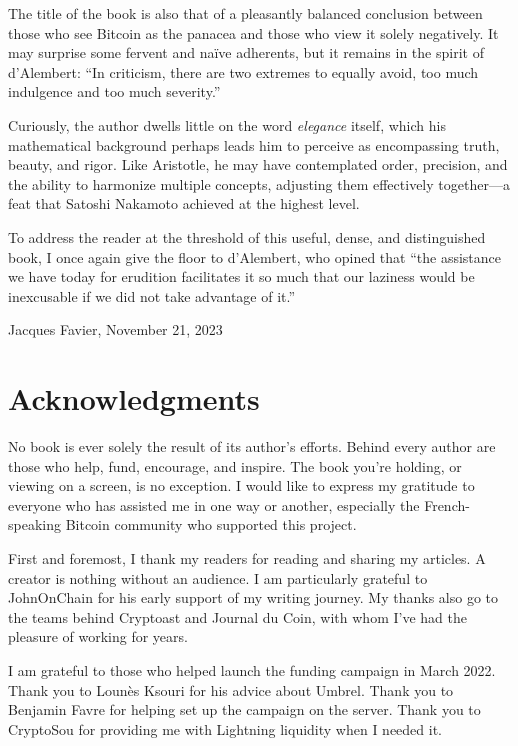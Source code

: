 \documentclass[
  a5paper,
  smalldemyvopaper,10pt,twoside,onecolumn,openright,extrafontsizes,hidelinks]{memoir}
\begin{document}
The title of the book is also that of a pleasantly balanced conclusion
between those who see Bitcoin as the panacea and those who view it
solely negatively. It may surprise some fervent and naïve adherents, but
it remains in the spirit of d'Alembert: ``In criticism, there are two
extremes to equally avoid, too much indulgence and too much severity.''

Curiously, the author dwells little on the word \emph{elegance} itself,
which his mathematical background perhaps leads him to perceive as
encompassing truth, beauty, and rigor. Like Aristotle, he may have
contemplated order, precision, and the ability to harmonize multiple
concepts, adjusting them effectively together---a feat that Satoshi
Nakamoto achieved at the highest level.

To address the reader at the threshold of this useful, dense, and
distinguished book, I once again give the floor to d'Alembert, who
opined that ``the assistance we have today for erudition facilitates it
so much that our laziness would be inexcusable if we did not take
advantage of it.''

Jacques Favier, November 21, 2023


\chapter*{Acknowledgments}\label{remerciements}


No book is ever solely the result of its author's efforts. Behind every
author are those who help, fund, encourage, and inspire. The book you're
holding, or viewing on a screen, is no exception. I would like to
express my gratitude to everyone who has assisted me in one way or
another, especially the French-speaking Bitcoin community who supported
this project.

First and foremost, I thank my readers for reading and sharing my
articles. A creator is nothing without an audience. I am particularly
grateful to JohnOnChain for his early support of my writing journey. My
thanks also go to the teams behind Cryptoast and Journal du Coin, with
whom I've had the pleasure of working for years.

I am grateful to those who helped launch the funding campaign in March
2022. Thank you to Lounès Ksouri for his advice about Umbrel. Thank you
to Benjamin Favre for helping set up the campaign on the server. Thank
you to CryptoSou for providing me with Lightning liquidity when I needed
it.
\end{document}
